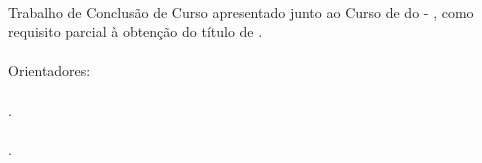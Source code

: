 %
%

\makeatletter
\begin{folhadeaprovacao}

\thispagestyle{empty}%
	
	\begin{center}
    
		\small\textbf{\expandafter\uppercase\expandafter{\imprimirnomeautor}}\\
		\vspace*{3.0 cm}%
		\normalsize\textbf{\expandafter\uppercase\expandafter{\imprimirtitulotb}}
		
    \end{center}
	
	\vspace*{0.35 cm}%
		    \large%
    		\hfill%
	    	\begin{minipage}{8 cm}%
	    		\begin{small} %
	    		\setlength{\baselineskip}{0.7\baselineskip}
				
		    	{Trabalho de Conclusão de Curso apresentado junto ao Curso de {\imprimirprograma }
		    	{\imprimirmodalidade} do {\imprimirinstituicao}{ - }{\imprimirdepartamento},
		    	como requisito parcial à obtenção do título de
		    	{\imprimirgrau }.}\\{
		    	}\vspace*{0.6 cm}\\Orientadores:\\ \\
		    	{\imprimirtitulacaoorientador }{ }{\imprimirorientador.}\\{
		    	}\\ {\imprimirtitulacaocoorientador }{ }{\imprimircoorientador.}			
				
				\end{small} %
		    \end{minipage}%
		    	
		    \vspace*{0.6 cm}%
		    
		    \large%
    		\hfill%
	    	 
		    
		    \normalsize %
		    \vspace*{1.5 cm}%
		    

\end{folhadeaprovacao}
